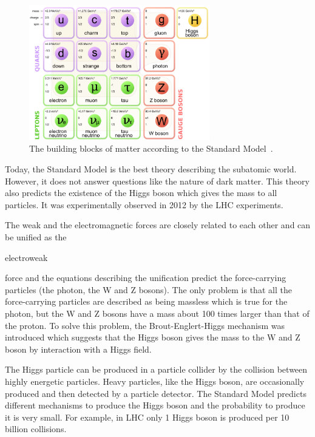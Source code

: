 \begin{figure}[htbp]
  \centering
  \includegraphics[width=0.7\textwidth]{figures/CLIC/StandardModel.png}
  \caption{The building blocks of matter according to the Standard
    Model~\cite{wikipediaParticles}.}
  \label{fig:standardmodel}
\end{figure}

Today, the Standard Model is the best theory describing the subatomic
world. However, it does not answer questions like the nature of dark
matter. This theory also predicts the existence of the Higgs boson
which gives the mass to all particles. It was experimentally observed
in 2012 by the LHC experiments.

The weak and the electromagnetic forces are closely related to each
other and can be unified as the \begin{it}electroweak\end{it} force
and the equations describing the unification predict the
force-carrying particles (the photon, the W and Z bosons). The only
problem is that all the force-carrying particles are described as
being massless which is true for the photon, but the W and Z bosons
have a mass about 100 times larger than that of the proton. To solve
this problem, the Brout-Englert-Higgs mechanism was introduced which
suggests that the Higgs boson gives the mass to the W and Z boson by
interaction with a Higgs field.

The Higgs particle can be produced in a particle collider by the
collision between highly energetic particles. Heavy particles, like
the Higgs boson, are occasionally produced and then detected by a
particle detector. The Standard Model predicts different mechanisms to
produce the Higgs boson and the probability to produce it is very
small. For example, in LHC only 1 Higgs boson is produced per 10
billion collisions.

